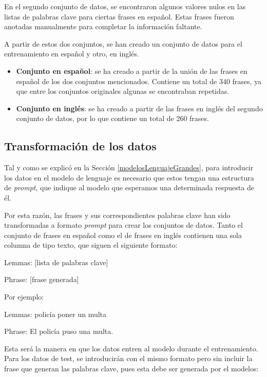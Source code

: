 \documentclass[11pt,spanish,listoffigures,listoftables]{tfgetsinf}
\begin{document}
En el segundo conjunto de datos, se encontraron algunos valores nulos en las listas de palabras clave para ciertas frases en español. Estas frases fueron anotadas manualmente para completar la información faltante.

A partir de estos dos conjuntos, se han creado un conjunto de datos para el entrenamiento en español y otro, en inglés.

\begin{itemize}
	\item \textbf{Conjunto en español}: se ha creado a partir de la unión de las frases en español de los dos conjuntos mencionados. Contiene un total de 340 frases, ya que entre los conjuntos originales algunas se encontraban repetidas.
	\item \textbf {Conjunto en inglés}: se ha creado a partir de las frases en inglés del segundo conjunto de datos, por lo que contiene un total de 260 frases.
\end{itemize}

\subsection{Transformación de los datos}

Tal y como se explicó en la Sección \ref{modelosLenguajeGrandes}, para introducir los datos en el modelo de lenguaje es necesario que estos tengan una estructura de \textit{prompt}, que indique al modelo que esperamos una determinada respuesta de él.

Por esta razón, las frases y sus correspondientes palabras clave han sido transformadas a formato \textit{prompt} para crear los conjuntos de datos. Tanto el conjunto de frases en español como el de frases en inglés contienen una sola columna de tipo texto, que siguen el siguiente formato:

\begin{displayquote}
Lemmas: [lista de palabras clave]

Phrase: [frase generada]
\end{displayquote}

Por ejemplo:

\begin{displayquote}
Lemmas: policía poner un multa

Phrase: El policía puso una multa.
\end{displayquote}

Esta será la manera en que los datos entren al modelo durante el entrenamiento. Para los datos de test, se introducirán con el mismo formato pero sin incluir la frase que generan las palabras clave, pues esta debe ser generada por el modelos:
\end{document}
